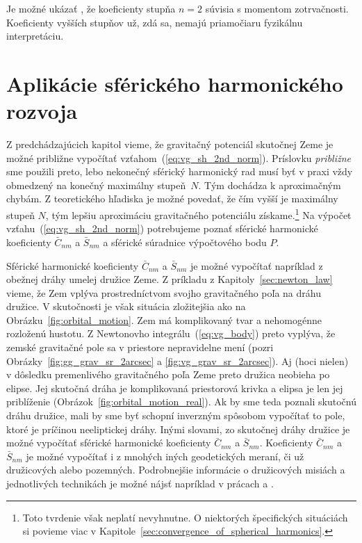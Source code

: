 \documentclass[a4paper, 12pt]{book}
\begin{document}
Je možné ukázať \citep[napríklad][]{MoritzPhysicalGeodesy}, že koeficienty 
stupňa $n = 2$ súvisia s momentom zotrvačnosti.  Koeficienty vyšších stupňov 
už, zdá sa, nemajú priamočiaru fyzikálnu interpretáciu.







\section{Aplikácie sférického harmonického rozvoja}
\label{sec:spherical_harmonics_applications}

Z predchádzajúcich kapitol vieme, že gravitačný potenciál skutočnej Zeme je 
možné približne vypočítať vzťahom~(\ref{eq:vg_sh_2nd_norm}).  Príslovku 
\emph{približne} sme použili preto, lebo nekonečný sférický harmonický rad musí 
byť v praxi vždy obmedzený na konečný maximálny stupeň~$N$.  Tým dochádza 
k aproximačným chybám.  Z teoretického hľadiska je možné povedať, že čím vyšší 
je maximálny stupeň $N$, tým lepšiu aproximáciu gravitačného potenciálu 
získame.\footnote{Toto tvrdenie však neplatí nevyhnutne.  O niektorých 
špecifických situáciách si povieme viac 
v Kapitole~\ref{sec:convergence_of_spherical_harmonics}.}  Na výpočet 
vzťahu~(\ref{eq:vg_sh_2nd_norm}) potrebujeme poznať sférické harmonické 
koeficienty $\bar{C}_{nm}$ a $\bar{S}_{nm}$ a sférické súradnice výpočtového 
bodu $P$.

Sférické harmonické koeficienty $\bar{C}_{nm}$ a $\bar{S}_{nm}$ je možné 
vypočítať napríklad z obežnej dráhy umelej družice Zeme.  Z príkladu 
z Kapitoly~\ref{sec:newton_law} vieme, že Zem vplýva prostredníctvom svojho 
gravitačného poľa na dráhu družice.  V skutočnosti je však situácia zložitejšia 
ako na Obrázku~\ref{fig:orbital_motion}.  Zem má komplikovaný tvar 
a nehomogénne rozloženú hustotu.  Z Newtonovho integrálu~(\ref{eq:vg_body}) 
preto vyplýva, že zemské gravitačné pole sa v priestore nepravidelne mení 
(pozri Obrázky~\ref{fig:gg_grav_sr_2arcsec} a \ref{fig:vg_grav_sr_2arcsec}).  
Aj (hoci nielen) v dôsledku premenlivého gravitačného poľa Zeme preto družica 
neobieha po elipse.  Jej skutočná dráha je komplikovaná priestorová krivka 
a elipsa je len jej priblíženie (Obrázok~\ref{fig:orbital_motion_real}).  Ak by 
sme teda poznali skutočnú dráhu družice, mali by sme byť schopní inverzným 
spôsobom vypočítať to pole, ktoré je príčinou neeliptickej dráhy.  Inými 
slovami, zo skutočnej dráhy družice je možné vypočítať sférické harmonické 
koeficienty $\bar{C}_{nm}$ a $\bar{S}_{nm}$.  Koeficienty $\bar{C}_{nm}$ 
a $\bar{S}_{nm}$ je možné vypočítať i z mnohých iných geodetických meraní, či 
už družicových alebo pozemných.  Podrobnejšie informácie o družicových misiách 
a jednotlivých technikách je možné nájsť napríklad v prácach 
\cite{SeeberSatelliteGeodesy} a \cite{MoritzPhysicalGeodesy}.
\end{document}
